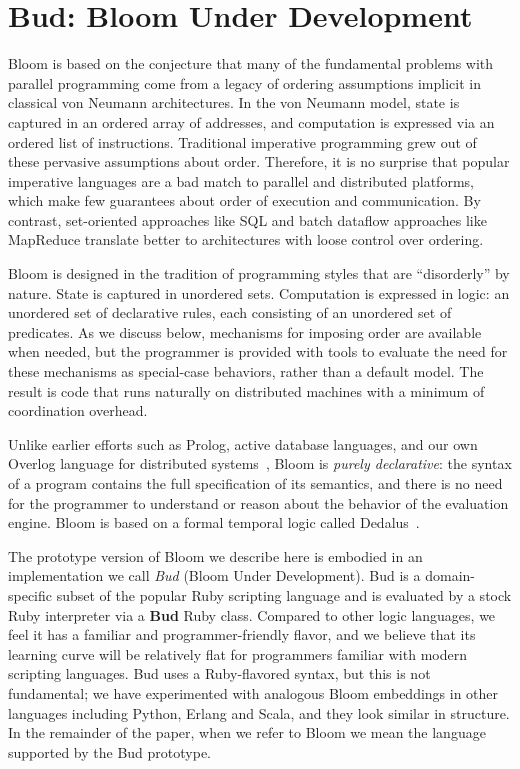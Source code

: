 \section{Bud: Bloom Under Development}
\label{sec:lang}
Bloom is based on the conjecture that many of the fundamental problems with
parallel programming come from a legacy of ordering assumptions implicit in classical von
Neumann architectures.  In the von Neumann model, state is captured in an
ordered array of addresses, and computation is expressed via an ordered list of
instructions.  Traditional imperative programming grew out of these pervasive
assumptions about order.  Therefore, it is no surprise that popular imperative
languages are a bad match to parallel and distributed platforms, which make few
guarantees about order of execution and communication. By contrast, set-oriented
approaches like SQL and batch dataflow approaches like MapReduce translate
better to architectures with loose control over ordering.

Bloom is designed in the tradition of programming styles that are ``disorderly''
by nature.  State is captured in unordered sets.  Computation is expressed
in logic: an unordered set of declarative rules, each consisting of an unordered
set of predicates.  As we discuss below, mechanisms for imposing order are
available when needed, but the programmer is provided with tools to evaluate the
need for these mechanisms as special-case behaviors, rather than a default
model.  The result is code that runs naturally on distributed machines with a
minimum of coordination overhead.
 
Unlike earlier efforts such as Prolog, active database languages, and our own
Overlog language for distributed systems~\cite{p2}, Bloom is {\em purely
  declarative}: the syntax of a program contains the full specification of its
semantics, and there is no need for the programmer to understand or reason about
the behavior of the evaluation engine.  Bloom is based on a formal temporal
logic called Dedalus~\cite{dedalus}.

The prototype version of Bloom we describe here is embodied in an implementation
we call {\em Bud} (Bloom Under Development).  Bud is a domain-specific subset of
the popular Ruby scripting language and is evaluated by a stock Ruby interpreter
via a \textbf{Bud} Ruby class.  Compared to other logic languages, we feel it
has a familiar and programmer-friendly flavor, and we believe that its learning
curve will be relatively flat for programmers familiar with modern scripting
languages.  Bud uses a Ruby-flavored syntax, but this is not fundamental; we
have experimented with analogous Bloom embeddings in other languages including
Python, Erlang and Scala, and they look similar in structure.  In the remainder
of the paper, when we refer to Bloom we mean the language supported by the Bud
prototype.


